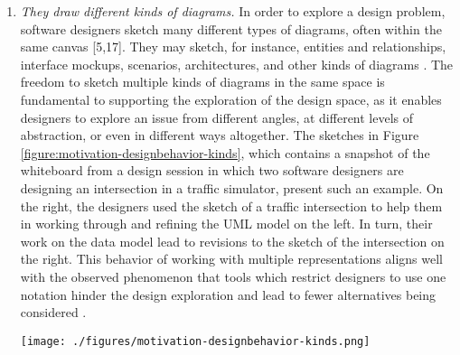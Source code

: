 \begin{enumerate}
\item \emph{They draw different kinds of diagrams.} In order to explore a design problem, software designers sketch many different types of diagrams, often within the same canvas [5,17]. They may sketch, for instance, entities and relationships, interface mockups, scenarios, architectures, and other kinds of diagrams \cite{cherubini2007let}. The freedom to sketch multiple kinds of diagrams in the same space is fundamental to supporting the exploration of the design space, as it enables designers to explore an issue from different angles, at different levels of abstraction, or even in different ways altogether. The sketches in Figure \ref{figure:motivation-designbehavior-kinds}, which contains a snapshot of the whiteboard from a design session in which two software designers are designing an intersection in a traffic simulator, present such an example. On the right, the designers used the sketch of a traffic intersection to help them in working through and refining the UML model on the left. In turn, their work on the data model lead to revisions to the sketch of the intersection on the right. This behavior of working with multiple representations aligns well with the observed phenomenon that tools which restrict designers to use one notation hinder the design exploration and lead to fewer alternatives being considered \cite{shipman1999incremental}. 

\begin{figure*}[tbh]
  \centering
  \texttt{[image: ./figures/motivation-designbehavior-kinds.png]}
  \caption{Diagram from a design session that includes UML diagrams, a map, and annotations.}
  \label{figure:motivation-designbehavior-kinds}
\end{figure*} 



\end{enumerate}
